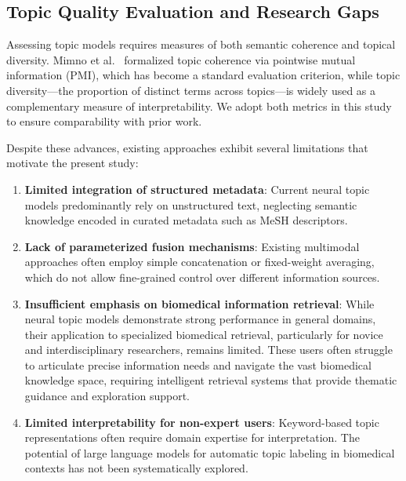 \documentclass[authorproof,JACIII,researchpaper]{fujipressarticle}
\begin{document}
\subsection{Topic Quality Evaluation and Research Gaps}

Assessing topic models requires measures of both semantic coherence and topical diversity. Mimno et al.~\cite{mimno_optimizing_2011} formalized topic coherence via pointwise mutual information (PMI), which has become a standard evaluation criterion, while topic diversity---the proportion of distinct terms across topics---is widely used as a complementary measure of interpretability. We adopt both metrics in this study to ensure comparability with prior work.

Despite these advances, existing approaches exhibit several limitations that motivate the present study:

\begin{enumerate}[leftmargin=*,label=\arabic*)]
    \item \textbf{Limited integration of structured metadata}: Current neural topic models predominantly rely on unstructured text, neglecting semantic knowledge encoded in curated metadata such as MeSH descriptors.

    \item \textbf{Lack of parameterized fusion mechanisms}: Existing multimodal approaches often employ simple concatenation or fixed-weight averaging, which do not allow fine-grained control over different information sources.

    \item \textbf{Insufficient emphasis on biomedical information retrieval}: While neural topic models demonstrate strong performance in general domains, their application to specialized biomedical retrieval, particularly for novice and interdisciplinary researchers, remains limited. These users often struggle to articulate precise information needs and navigate the vast biomedical knowledge space, requiring intelligent retrieval systems that provide thematic guidance and exploration support.

    \item \textbf{Limited interpretability for non-expert users}: Keyword-based topic representations often require domain expertise for interpretation. The potential of large language models for automatic topic labeling in biomedical contexts has not been systematically explored.
\end{enumerate}
\end{document}
